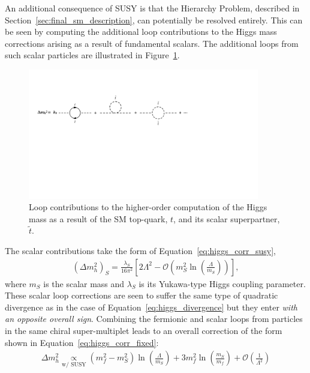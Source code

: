 An additional consequence of SUSY is that the Hierarchy Problem, described in Section~\ref{sec:final_sm_description},
can potentially be resolved entirely.
This can be seen by computing the additional loop contributions to the Higgs mass corrections arising as a result of fundamental scalars.
The additional loops from such scalar particles are illustrated in Figure~\ref{fig:higgs_mass_correction_stop}.
\begin{figure}[!htb]
    \begin{center}
        \includegraphics[width=0.9\textwidth]{figures/higgs_corr/higgs_mass_corrections_stopPDF}
        \caption{
            Loop contributions to the higher-order computation of the Higgs mass as a result of the SM top-quark, $t$,
            and its scalar superpartner, $\tilde{t}$.
        }
        \label{fig:higgs_mass_correction_stop}
    \end{center}
\end{figure}
The scalar contributions take the form of Equation~\ref{eq:higgs_corr_susy},
\begin{align}
    \left( \Delta m_h^2 \right)_{S} = \frac{\lambda_S}{16 \pi^2} \left[ 2 \Lambda^2 - \mathcal{O} \left( m_S^2 \ln \left( \frac{\Lambda}{m_S} \right) \right) \right],
    \label{eq:higgs_corr_susy}
\end{align}
where $m_S$ is the scalar mass and $\lambda_S$ is its Yukawa-type Higgs coupling parameter.
These scalar loop corrections are seen to suffer the same type of quadratic divergence
as in the case of Equation~\ref{eq:higgs_divergence} but they enter \textit{with an opposite overall sign}.
Combining the fermionic and scalar loops from particles in the same chiral super-multiplet leads
to an overall correction of the form shown in Equation~\ref{eq:higgs_corr_fixed}:
\begin{align}
    \Delta m_h^2 \underset{\text{w/ SUSY}}{\propto} \left( m_f^2 - m_S^2 \right) \ln \left( \frac{\Lambda}{m_S} \right) + 3 m_f^2 \ln \left( \frac{m_S}{m_f} \right) + \mathcal{O} \left( \frac{1}{\Lambda^2} \right)
    \label{eq:higgs_corr_fixed}
\end{align}
